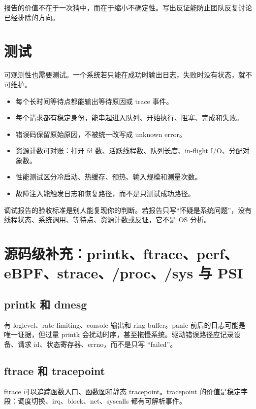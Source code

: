 报告的价值不在于一次猜中，而在于缩小不确定性。写出反证能防止团队反复讨论已经排除的方向。

\section{测试}

可观测性也需要测试。一个系统若只能在成功时输出日志，失败时没有状态，就不可维护。

\begin{itemize}
\tightlist
\item 每个长时间等待点都能输出等待原因或 trace 事件。
\item 每个请求都有稳定身份，能串起进入队列、开始执行、阻塞、完成和失败。
\item 错误码保留原始原因，不被统一改写成 unknown error。
\item 资源计数可对账：打开 fd 数、活跃线程数、队列长度、in-flight I/O、分配对象数。
\item 性能测试区分冷启动、热缓存、预热、输入规模和测量次数。
\item 故障注入能触发日志和恢复路径，而不是只测试成功路径。
\end{itemize}

调试报告的验收标准是别人能复现你的判断。若报告只写“怀疑是系统问题”，没有线程状态、系统调用、等待点、资源计数或反证，它不是 OS 分析。

\section{源码级补充：printk、ftrace、perf、eBPF、strace、/proc、/sys 与 PSI}

\subsection{printk 和 dmesg}

 有 loglevel、rate limiting、console 输出和 ring buffer。panic 前后的日志可能是唯一证据，但过量 printk 会扰动时序，甚至拖慢系统。驱动错误路径应记录设备、请求 id、状态寄存器、errno，而不是只写 “failed”。

\subsection{ftrace 和 tracepoint}

ftrace 可以追踪函数入口、函数图和静态 tracepoint。tracepoint 的价值是稳定字段：调度切换、irq、block、net、syscalls 都有可解析事件。

